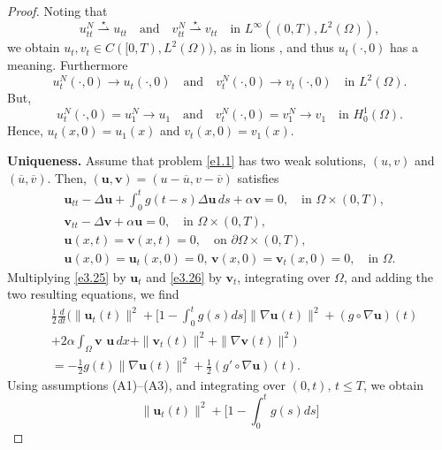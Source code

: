 \documentclass[10pt,a4paper]{amsart}
\numberwithin{equation}{section}
\begin{document}
\begin{proof}
Noting that
\[
 u_{tt}^{N} \overset{\star}{\rightharpoonup} u_{tt} \quad \text{and} \quad
 v_{tt}^{N} \overset{\star}{\rightharpoonup} v_{tt} \quad \text{in }
 L^\infty((0,T), L^2(\Omega)),
\]
we obtain $ u_t , v_{t} \in C([0, T), L^2(\Omega))$, as in lions \cite{Lions},
and thus \( u_t(\cdot, 0) \) has a meaning. Furthermore
\[
u^N_t(\cdot, 0) \to u_t(\cdot, 0) \quad \text{and} \quad
v^N_t(\cdot, 0) \to v_t(\cdot, 0) \quad\text{in } L^2(\Omega).
\]
But,
\[ u^N_t(\cdot, 0) = u^N_1 \to u_1 \quad \text{and} \quad
 v^N_t(\cdot, 0) = v^N_1 \to v_1 \quad \text{in } H^1_0(\Omega).
\]
Hence,
$u_t(x, 0) = u_1(x)$ and $v_t(x, 0) = v_1(x)$.
\smallskip

\noindent\textbf{Uniqueness.}
Assume that problem \eqref{e1.1} has two weak solutions, \( (u, v) \) and
\( (\overline{u},\overline{v}) \). Then,
\( (\mathbf{u}, \mathbf{v}) = (u - \overline{u}, v - \overline{v}) \) satisfies
\begin{gather}
 \mathbf{u}_{tt} - \Delta \mathbf{u} + \int_0^t g(t-s) \Delta \mathbf{u} \, ds
 + \alpha \mathbf{v} = 0, \quad \text{in } \Omega \times (0, T), \label{e3.25}\\
 \mathbf{v}_{tt} - \Delta \mathbf{v} + \alpha \mathbf{u} = 0, \quad
 \text{in } \Omega \times (0, T), \label{e3.26} \\
 \mathbf{u}(x,t) = \mathbf{v}(x,t) = 0, \quad \text{on } \partial\Omega \times (0, T),
 \label{e3.27}\\
 \mathbf{u}(x,0) = \mathbf{u}_t(x,0) =0,\, \mathbf{v}(x,0)=\mathbf{v}_t(x,0) = 0,
 \quad \text{in } \Omega. \label{e3.28}
\end{gather}
Multiplying \eqref{e3.25} by $\mathbf{u}_{t}$ and \eqref{e3.26} by $\mathbf{v}_{t}$,
integrating over $\Omega$, and adding the two resulting equations, we find
\begin{equation}
\begin{aligned}
&\frac{1}{2}\frac{d}{dt} \Big( \| \mathbf{u}_{t}(t) \| ^2
 + \Big[ 1-\int_0^t g(s) ds \Big] \| \nabla \mathbf{u} (t)\|^2
 +(g\circ \nabla \mathbf{u})(t) \\
&+2 \alpha \int_\Omega \mathbf{v}\textbf{ u}\,dx
 +\| \mathbf{v}_{t}(t) \|^2 + \| \nabla \mathbf{v} (t)\|^2 \Big)\\
& = -\frac{1}{2} g(t)\parallel \nabla \mathbf{u}(t) \parallel^2
 + \frac{1}{2}( g'\circ\nabla \mathbf{u}) (t).
\end{aligned} \label{e3.29}
\end{equation}
Using assumptions (A1)--(A3), and integrating over $(0, t),\, t\leq T$, we obtain
\[
 \| \mathbf{u}_{t}(t) \| ^2+ \Big[ 1-\int_0^t g(s) ds \Big]
\]
\end{proof}
\end{document}
